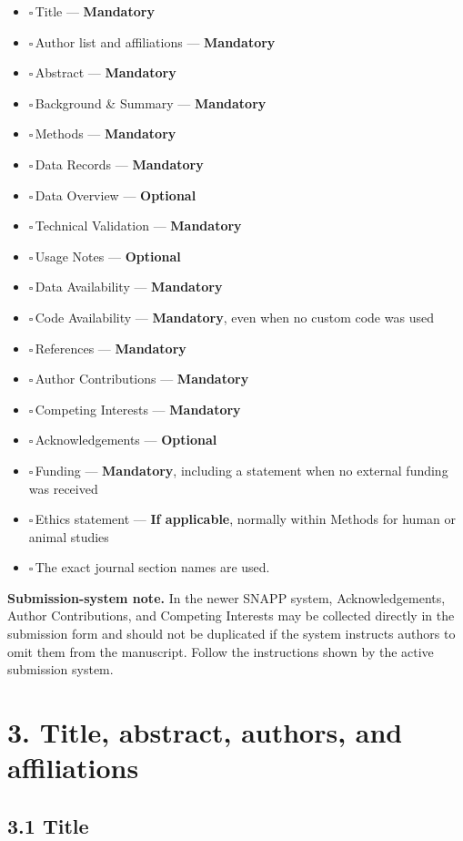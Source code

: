 \documentclass[11pt]{article}
\newcommand{\cbox}{$\square$\,}
\newcommand{\mandatory}{\textcolor{red!70!black}{\textbf{Mandatory}}}
\newcommand{\optional}{\textcolor{blue!65!black}{\textbf{Optional}}}
\newcommand{\conditional}{\textcolor{orange!80!black}{\textbf{If applicable}}}
\begin{document}
\begin{itemize}
    \item \cbox Title --- \mandatory
    \item \cbox Author list and affiliations --- \mandatory
    \item \cbox Abstract --- \mandatory
    \item \cbox Background \& Summary --- \mandatory
    \item \cbox Methods --- \mandatory
    \item \cbox Data Records --- \mandatory
    \item \cbox Data Overview --- \optional
    \item \cbox Technical Validation --- \mandatory
    \item \cbox Usage Notes --- \optional
    \item \cbox Data Availability --- \mandatory
    \item \cbox Code Availability --- \mandatory, even when no custom code was used
    \item \cbox References --- \mandatory
    \item \cbox Author Contributions --- \mandatory
    \item \cbox Competing Interests --- \mandatory
    \item \cbox Acknowledgements --- \optional
    \item \cbox Funding --- \mandatory, including a statement when no external funding was received
    \item \cbox Ethics statement --- \conditional, normally within Methods for human or animal studies
    \item \cbox The exact journal section names are used.
\end{itemize}

\textbf{Submission-system note.} In the newer SNAPP system, Acknowledgements, Author Contributions, and Competing Interests may be collected directly in the submission form and should not be duplicated if the system instructs authors to omit them from the manuscript. Follow the instructions shown by the active submission system.

\section*{3. Title, abstract, authors, and affiliations}

\subsection*{3.1 Title}
\end{document}
